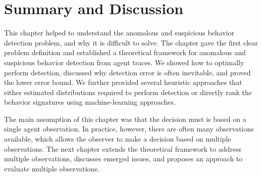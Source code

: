 \section{Summary and Discussion}
This chapter helped to understand the anomalous and suspicious behavior detection problem, and why it is difficult to solve. The chapter gave the first clear problem definition and established a theoretical framework for anomalous and suspicious behavior detection from agent traces. We showed how to optimally perform detection, discussed why detection error is often inevitable, and proved the lower error bound. We further provided several heuristic approaches that either estimated distributions required to perform detection or directly rank the behavior signatures using machine-learning approaches.

The main assumption of this chapter was that the decision must is based on a single agent observation. In practice, however, there are often many observations available, which allows the observer to make a decision based on multiple observations. The next chapter extends the theoretical framework to address multiple observations, discusses emerged issues, and proposes an approach to evaluate multiple observations.









